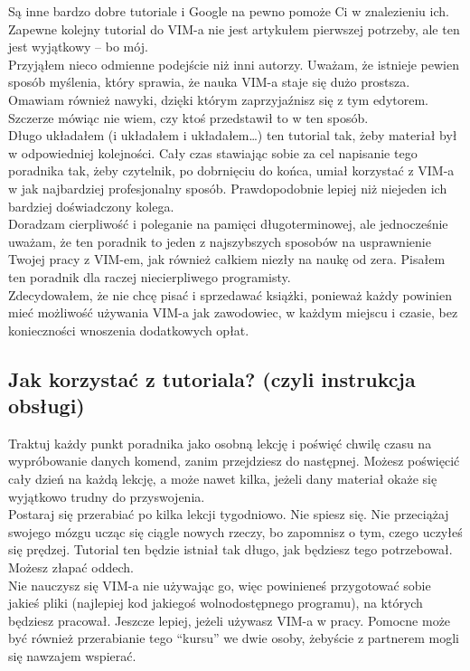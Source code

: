 \documentclass[a4paper,12pt]{article}
\begin{document}
Są inne bardzo dobre tutoriale i Google na pewno pomoże Ci w znalezieniu ich. Zapewne kolejny tutorial do VIM-a nie jest artykułem pierwszej potrzeby, ale ten jest wyjątkowy – bo mój.\\
Przyjąłem nieco odmienne podejście niż inni autorzy. Uważam, że istnieje pewien sposób myślenia, który sprawia, że nauka VIM-a staje się dużo prostsza. Omawiam również nawyki, dzięki którym zaprzyjaźnisz się z tym edytorem. Szczerze mówiąc nie wiem, czy ktoś przedstawił to w ten sposób.\\
Długo układałem (i układałem i układałem\ldots) ten tutorial tak, żeby materiał był w odpowiedniej kolejności. Cały czas stawiając sobie za cel napisanie tego poradnika tak, żeby czytelnik, po dobrnięciu do końca, umiał korzystać z VIM-a w jak najbardziej profesjonalny sposób. Prawdopodobnie lepiej niż niejeden ich bardziej doświadczony kolega.\\
Doradzam cierpliwość i poleganie na pamięci długoterminowej, ale jednocześnie uważam, że ten poradnik to jeden z najszybszych sposobów na usprawnienie Twojej pracy z VIM-em, jak również całkiem niezły na naukę od zera. Pisałem ten poradnik dla raczej niecierpliwego programisty.\\
Zdecydowałem, że nie chcę pisać i sprzedawać książki, ponieważ każdy powinien mieć możliwość używania VIM-a jak zawodowiec, w każdym miejscu i czasie, bez konieczności wnoszenia dodatkowych opłat.

\subsection{Jak korzystać z tutoriala? (czyli instrukcja obsługi)}
Traktuj każdy punkt poradnika jako osobną lekcję i poświęć chwilę czasu na wypróbowanie danych komend, zanim przejdziesz do następnej. Możesz poświęcić cały dzień na każdą lekcję, a może nawet kilka, jeżeli dany materiał okaże się wyjątkowo trudny do przyswojenia.\\
Postaraj się przerabiać po kilka lekcji tygodniowo. Nie spiesz się. Nie przeciążaj swojego mózgu ucząc się ciągle nowych rzeczy, bo zapomnisz o tym, czego uczyłeś się prędzej. Tutorial ten będzie istniał tak długo, jak będziesz tego potrzebował. Możesz złapać oddech.\\
Nie nauczysz się VIM-a nie używając go, więc powinieneś przygotować sobie jakieś pliki (najlepiej kod jakiegoś wolnodostępnego programu), na których będziesz pracował. Jeszcze lepiej, jeżeli używasz VIM-a w pracy. Pomocne może być również przerabianie tego “kursu” we dwie osoby, żebyście z partnerem mogli się nawzajem wspierać.
\end{document}
